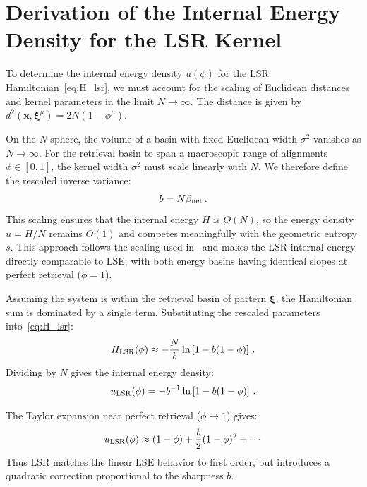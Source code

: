 \documentclass{article}
\theoremstyle{plain}
\theoremstyle{definition}
\theoremstyle{remark}
\begin{document}
\section{Derivation of the Internal Energy Density for the LSR Kernel}\label{app:lsr_energy}

To determine the internal energy density $u(\phi)$ for the LSR Hamiltonian~\eqref{eq:H_lsr}, we must account for the scaling of Euclidean distances and kernel parameters in the limit $N \to \infty$. The distance is given by $d^2(\bm{x}, \bm{\xi}^\mu) = 2N(1 - \phi^\mu)$.

On the $N$-sphere, the volume of a basin with fixed Euclidean width $\sigma^2$ vanishes as $N \to \infty$. For the retrieval basin to span a macroscopic range of alignments $\phi \in [0, 1]$, the kernel width $\sigma^2$ must scale linearly with $N$. We therefore define the rescaled inverse variance:
\begin{equation}
    b = N \beta_{\rm net}\,.
\end{equation}
This scaling ensures that the internal energy $H$ is $O(N)$, so the energy density $u = H/N$ remains $O(1)$ and competes meaningfully with the geometric entropy $s$. This approach follows the scaling used in~\citet{hoover2025dense} and makes the LSR internal energy directly comparable to LSE, with both energy basins having identical slopes at perfect retrieval ($\phi = 1$).

Assuming the system is within the retrieval basin of pattern $\bm{\xi}$, the Hamiltonian sum is dominated by a single term. Substituting the rescaled parameters into~\eqref{eq:H_lsr}:
\begin{equation}
    H_{\rm LSR}(\phi) \approx -\frac{N}{b} \ln \left[ 1 - b(1-\phi) \right]\,.
\end{equation}
Dividing by $N$ gives the internal energy density:
\begin{equation}
    u_{\rm LSR}(\phi) = -b^{-1} \ln \left[ 1 - b(1-\phi) \right]\,.
\end{equation}

The Taylor expansion near perfect retrieval ($\phi \to 1$) gives:
\begin{equation}
    u_{\rm LSR}(\phi) \approx (1-\phi) + \frac{b}{2}(1-\phi)^2 + \cdots
\end{equation}
Thus LSR matches the linear LSE behavior to first order, but introduces a quadratic correction proportional to the sharpness $b$.



\end{document}
